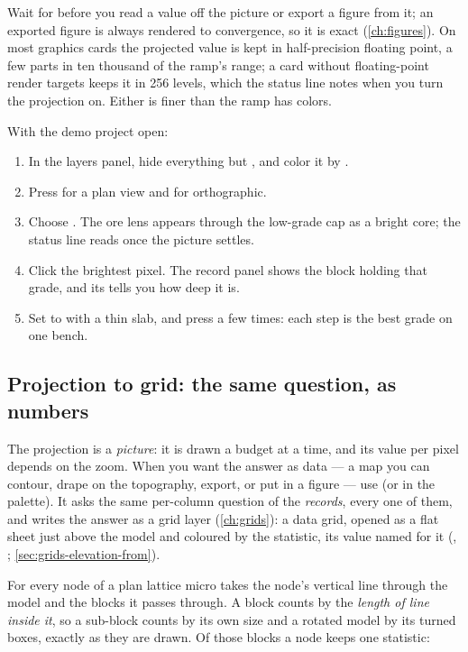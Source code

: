 Wait for  before you read a value off the picture or export a figure from it; an exported figure is always rendered to convergence, so it is exact (\cref{ch:figures}). On most graphics cards the projected value is kept in half-precision floating point, a few parts in ten thousand of the ramp's range; a card without floating-point render targets keeps it in 256 levels, which the status line notes when you turn the projection on. Either is finer than the ramp has colors.

\begin{tryit}
With the demo project open:
\begin{enumerate}
\item In the layers panel, hide everything but , and color it by .
\item Press  for a plan view and  for orthographic.
\item Choose . The ore lens appears through the low-grade cap as a bright core; the status line reads  once the picture settles.
\item Click the brightest pixel. The record panel shows the block holding that grade, and its  tells you how deep it is.
\item Set  to  with a thin slab, and press  a few times: each step is the best grade on one bench.
\end{enumerate}
\end{tryit}

\subsection{Projection to grid: the same question, as numbers}\label{sec:color-projgrid}
The projection is a \emph{picture}: it is drawn a budget at a time, and its value per pixel depends on the zoom. When you want the answer as data — a map you can contour, drape on the topography, export, or put in a figure — use  (or  in the palette). It asks the same per-column question of the \emph{records}, every one of them, and writes the answer as a grid layer (\cref{ch:grids}): a data grid, opened as a flat sheet just above the model and coloured by the statistic, its value named for it (, ; \cref{sec:grids-elevation-from}).

For every node of a plan lattice micro takes the node's vertical line through the model and the blocks it passes through. A block counts by the \emph{length of line inside it}, so a sub-block counts by its own size and a rotated model by its turned boxes, exactly as they are drawn. Of those blocks a node keeps one statistic:

